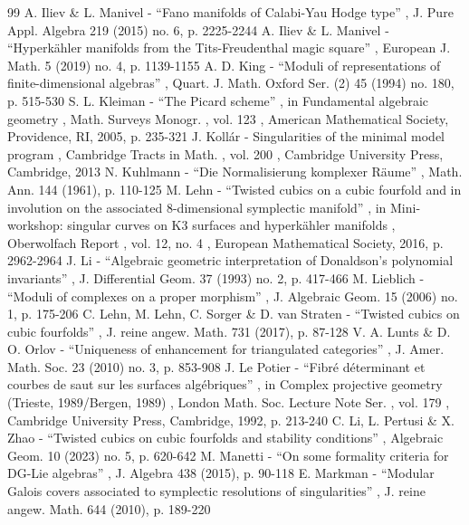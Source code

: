 \documentclass[11pt]{article}
\theoremstyle{definition}
\begin{document}
\begin{thebibliography}{99}
 A. Iliev \& L. Manivel - “Fano manifolds of Calabi-Yau Hodge type” , J. Pure Appl. Algebra 219 (2015) no. 6, p. 2225-2244
 A. Iliev \& L. Manivel - “Hyperkähler manifolds from the Tits-Freudenthal magic square” , European J. Math. 5 (2019) no. 4, p. 1139-1155
 A. D. King - “Moduli of representations of finite-dimensional algebras” , Quart. J. Math. Oxford Ser. (2) 45 (1994) no. 180, p. 515-530
 S. L. Kleiman - “The Picard scheme” , in Fundamental algebraic geometry , Math. Surveys Monogr. , vol. 123 , American Mathematical Society, Providence, RI, 2005, p. 235-321
 J. Kollár - Singularities of the minimal model program , Cambridge Tracts in Math. , vol. 200 , Cambridge University Press, Cambridge, 2013
 N. Kuhlmann - “Die Normalisierung komplexer Räume” , Math. Ann. 144 (1961), p. 110-125
 M. Lehn - “Twisted cubics on a cubic fourfold and in involution on the associated 8-dimensional symplectic manifold” , in Mini-workshop: singular curves on K3 surfaces and hyperkähler manifolds , Oberwolfach Report , vol. 12, no. 4 , European Mathematical Society, 2016, p. 2962-2964
 J. Li - “Algebraic geometric interpretation of Donaldson’s polynomial invariants” , J. Differential Geom. 37 (1993) no. 2, p. 417-466
 M. Lieblich - “Moduli of complexes on a proper morphism” , J. Algebraic Geom. 15 (2006) no. 1, p. 175-206
 C. Lehn, M. Lehn, C. Sorger \& D. van Straten - “Twisted cubics on cubic fourfolds” , J. reine angew. Math. 731 (2017), p. 87-128
 V. A. Lunts \& D. O. Orlov - “Uniqueness of enhancement for triangulated categories” , J. Amer. Math. Soc. 23 (2010) no. 3, p. 853-908
 J. Le Potier - “Fibré déterminant et courbes de saut sur les surfaces algébriques” , in Complex projective geometry (Trieste, 1989/Bergen, 1989) , London Math. Soc. Lecture Note Ser. , vol. 179 , Cambridge University Press, Cambridge, 1992, p. 213-240
 C. Li, L. Pertusi \& X. Zhao - “Twisted cubics on cubic fourfolds and stability conditions” , Algebraic Geom. 10 (2023) no. 5, p. 620-642
 M. Manetti - “On some formality criteria for DG-Lie algebras” , J. Algebra 438 (2015), p. 90-118
 E. Markman - “Modular Galois covers associated to symplectic resolutions of singularities” , J. reine angew. Math. 644 (2010), p. 189-220

\end{thebibliography}
\end{document}
